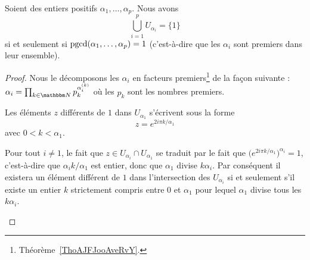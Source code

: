 \begin{proposition}  \label{PropFDDHooEyYxBC}
    Soient des entiers positifs \( \alpha_1,\ldots, \alpha_p\). Nous avons
    \begin{equation}
        \bigcup_{i=1}^pU_{\alpha_i}=\{ 1 \}
    \end{equation}
    si et seulement si \( \operatorname{pgcd}(\alpha_1,\ldots, \alpha_p)=1\) (c'est-à-dire que les \( \alpha_i\) sont premiers dans leur ensemble).
\end{proposition}

\begin{proof}
    Nous le décomposons les \( \alpha_i\) en facteurs premiers\footnote{Théorème~\ref{ThoAJFJooAveRvY}.} de la façon suivante : \( \alpha_i=\prod_{k\in \eN}p_k^{\alpha_i^{(k)}}\) où les \( p_k\) sont les nombres premiers.

    \begin{subproof}
    \item[Caractérisation par une décomposition en facteurs premiers]
        Les éléments \( z\) différents de \( 1\) dans \( U_{\alpha_1}\) s'écrivent sous la forme
        \begin{equation}
            z= e^{2i\pi k/\alpha_1}
        \end{equation}
        avec \( 0<k<\alpha_1\).

        Pour tout \( i\neq 1\), le fait que \( z\in U_{\alpha_i}\cap U_{\alpha_1}\) se traduit par le fait que \( \big(  e^{2i\pi k/\alpha_1} \big)^{\alpha_i}=1\), c'est-à-dire que \( \alpha_ik/\alpha_1\) est entier, donc que \( \alpha_1\) divise \( k\alpha_i\). Par conséquent il existera un élément différent de \( 1\) dans l'intersection des \( U_{\alpha_i}\) si et seulement s'il existe un entier \( k\) strictement compris entre \( 0\) et \( \alpha_1\) pour lequel \( \alpha_1\) divise tous les \( k\alpha_i\).


\end{subproof}
\end{proof}
